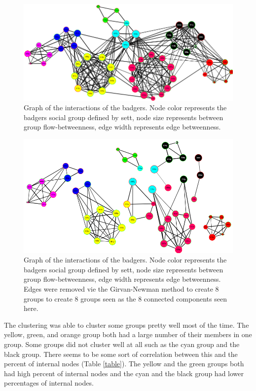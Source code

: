 \documentclass{sig-alternate-05-2015}
\begin{document}
\begin{figure}[t]
\includegraphics[width=\linewidth]{bace-flow.PNG}
\caption{Graph of the interactions of the badgers.  Node color represents the badgers social group defined by sett, node size represents between group flow-betweenness, edge width represents edge betweenness.} %
\label{bace} %
\end{figure}

\begin{figure}[h]
\includegraphics[width=\linewidth]{flow-8.PNG}
\caption{Graph of the interactions of the badgers.  Node color represents the badgers social group defined by sett, node size represents between group flow-betweenness, edge width represents edge betweenness.  Edges were removed vie the Girvan-Newman method to create 8 groups to create 8 groups seen as the 8 connected components seen here.} %
\label{flow-8} %
\end{figure}

\indent The clustering was able to cluster some groups pretty well most of the time.  The yellow, green, and orange group both had a large number of their members in one group.  Some groups did not cluster well at all such as the cyan group and the black group.  There seems to be some sort of correlation between this and the percent of internal nodes (Table \ref{table}).  The yellow and the green groups both had high percent of internal nodes and the cyan and the black group had lower percentages of internal nodes.  
\end{document}
